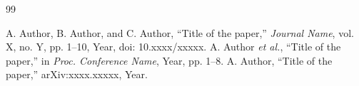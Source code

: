 \documentclass[12pt,a4paper]{report}
\begin{document}
\renewcommand{\bibname}{References}
\begin{singlespacing}
\begin{thebibliography}{99}
 A. Author, B. Author, and C. Author, ``Title of the paper,'' \emph{Journal Name}, vol. X, no. Y, pp. 1--10, Year, doi: 10.xxxx/xxxxx.
 A. Author \emph{et al.}, ``Title of the paper,'' in \emph{Proc. Conference Name}, Year, pp. 1--8.
 A. Author, ``Title of the paper,'' arXiv:xxxx.xxxxx, Year.
\end{thebibliography}
\end{singlespacing}
\end{document}
